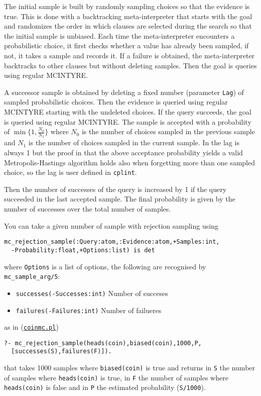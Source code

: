 The initial sample is built by  randomly sampling choices so that the evidence is true. This is done with
a backtracking meta-interpreter that starts with the goal and
randomizes the order in which clauses are selected during the search so that the initial sample is unbiased. Each time the meta-interpreter encounters
a probabilistic choice, it first checks whether a
value has already been sampled, if not, it takes
a sample and records it. If a failure is obtained,
the meta-interpreter backtracks to other clauses but
without deleting samples. Then the goal is queries using
regular MCINTYRE.

A successor sample is obtained by deleting a
fixed number (parameter \verb|Lag|) of sampled probabilistic choices. Then the
evidence is queried using regular MCINTYRE starting with the undeleted choices.
If the query succeeds, the goal is queried using regular MCINTYRE.
The sample is accepted with a probability of $\min\{1,\frac{N_0}{N_1}\}$ where $N_0$ is the number of choices sampled
in the previous sample and $N_1$ is the number of choices sampled in the current sample.
In \cite{nampally2014adaptive} the lag is always 1 but the proof in \cite{nampally2014adaptive} that the above acceptance
probability yields a valid
Metropolis-Hastings algorithm holds also when forgetting more than one
sampled choice, so the lag is
user defined in \verb|cplint|.

Then the number of successes of the query is increased by 1 if the query succeeded in the last accepted
sample. The final probability is given by the number of successes over the total
number of samples.

You can take a given number of sample with rejection sampling using
\begin{verbatim}
mc_rejection_sample(:Query:atom,:Evidence:atom,+Samples:int,
  -Probability:float,+Options:list) is det
\end{verbatim}
where
\verb|Options| is a list of options, the following are recognised by \verb|mc_sample_arg/5|:
\begin{itemize}
\item \verb|successes(-Successes:int)|
Number of succeses
\item \verb|failures(-Failures:int)|
Number of failueres
\end{itemize}
as in (\href{http://cplint.eu/e/coinmc.pl}{\texttt{coinmc.pl}})
\begin{verbatim}
?- mc_rejection_sample(heads(coin),biased(coin),1000,P,
  [successes(S),failures(F)]).
\end{verbatim}
that takes 1000 samples where \verb|biased(coin)| is true and returns in \verb|S| the number of samples where
\verb|heads(coin)| is true, in \verb|F| the number of samples where \verb|heads(coin)| is false and in \verb|P| the
estimated probability (\verb|S/1000|).

